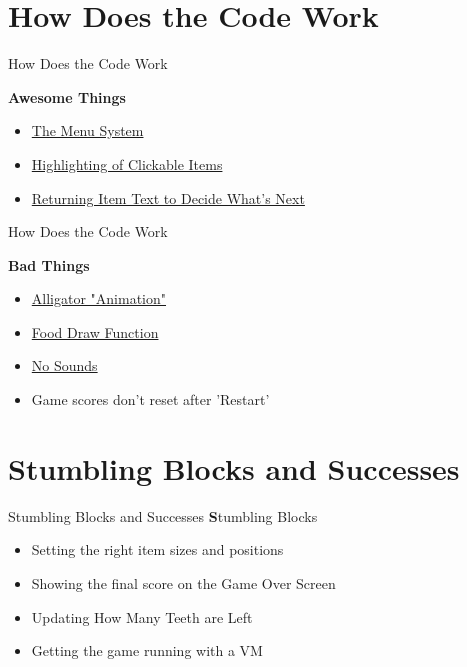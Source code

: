 \documentclass[10pt, compress]{beamer}
\begin{document}
\section{How Does the Code Work}

\begin{frame}{How Does the Code Work}

\textbf{Awesome Things}
\begin{itemize}
\item \href{https://github.com/amm4108/AngleGators/blob/master/Scene.py}{The Menu System}
\item \href{https://github.com/amm4108/AngleGators/blob/master/Scene.py\#L140}{Highlighting of Clickable Items}
\item \href{https://github.com/amm4108/AngleGators/blob/master/angle_gators.py\#L104}{Returning Item Text to Decide What's Next}
\end{itemize}

\end{frame}

\begin{frame}{How Does the Code Work}

\textbf{Bad Things}
\begin{itemize}
\item \href{https://github.com/amm4108/AngleGators/blob/master/Alligator.py\#L48}{Alligator "Animation"}
\item \href{https://github.com/amm4108/AngleGators/blob/master/Food.py\#L63}{Food Draw Function}
\item \href{https://github.com/amm4108/AngleGators/issues/32}{No Sounds}
\item Game scores don't reset after 'Restart'
\end{itemize}

\end{frame}

\section{Stumbling Blocks and Successes}

\begin{frame}{Stumbling Blocks and Successes}
    \textbf Stumbling Blocks
    \begin{itemize}
    \item Setting the right item sizes and positions
    \item Showing the final score on the Game Over Screen
    \item Updating How Many Teeth are Left
    \item Getting the game running with a VM
    \end{itemize}
\end{frame}
\end{document}
